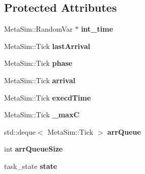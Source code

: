 \subsection*{Protected Attributes}
\begin{DoxyCompactItemize}
\item 
Meta\+Sim\+::\+Random\+Var $\ast$ {\bfseries int\+\_\+time}\hypertarget{classRTSim_1_1Task_a26e592c148e2dd37e9697eba46061b6b}{}\label{classRTSim_1_1Task_a26e592c148e2dd37e9697eba46061b6b}

\item 
Meta\+Sim\+::\+Tick {\bfseries last\+Arrival}\hypertarget{classRTSim_1_1Task_a8ec91265cb3547c5ba9c57e8cdd04e89}{}\label{classRTSim_1_1Task_a8ec91265cb3547c5ba9c57e8cdd04e89}

\item 
Meta\+Sim\+::\+Tick {\bfseries phase}\hypertarget{classRTSim_1_1Task_a12598b238b111ef65183e60a81c0728d}{}\label{classRTSim_1_1Task_a12598b238b111ef65183e60a81c0728d}

\item 
Meta\+Sim\+::\+Tick {\bfseries arrival}\hypertarget{classRTSim_1_1Task_aef16de6c8e85ec32a3b010143510c398}{}\label{classRTSim_1_1Task_aef16de6c8e85ec32a3b010143510c398}

\item 
Meta\+Sim\+::\+Tick {\bfseries execd\+Time}\hypertarget{classRTSim_1_1Task_a7e27d4a014e6c5b3849047e654ee14fb}{}\label{classRTSim_1_1Task_a7e27d4a014e6c5b3849047e654ee14fb}

\item 
Meta\+Sim\+::\+Tick {\bfseries \+\_\+maxC}\hypertarget{classRTSim_1_1Task_a8c8eb3c6e6d142c8d6bc813be8251dc5}{}\label{classRTSim_1_1Task_a8c8eb3c6e6d142c8d6bc813be8251dc5}

\item 
std\+::deque$<$ Meta\+Sim\+::\+Tick $>$ {\bfseries arr\+Queue}\hypertarget{classRTSim_1_1Task_a9f4afc4f8902529efd44e3df28956d29}{}\label{classRTSim_1_1Task_a9f4afc4f8902529efd44e3df28956d29}

\item 
int {\bfseries arr\+Queue\+Size}\hypertarget{classRTSim_1_1Task_a6c9b148a3988b907b31ee02e2c32f978}{}\label{classRTSim_1_1Task_a6c9b148a3988b907b31ee02e2c32f978}

\item 
task\+\_\+state {\bfseries state}\hypertarget{classRTSim_1_1Task_aeb71c01e949aa7394af6630cffe95a8b}{}\label{classRTSim_1_1Task_aeb71c01e949aa7394af6630cffe95a8b}


\end{DoxyCompactItemize}
